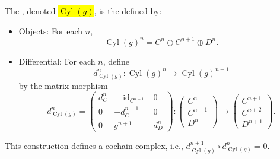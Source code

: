 \begin{definition}
\begin{enumerate}
        The , denoted \hl{$\operatorname{Cyl}(g)$}, is the  defined by:
        \begin{itemize}
        \item Objects: For each $n$, 
        $$\operatorname{Cyl}(g)^n = C^n \oplus C^{n+1} \oplus D^n.$$
        \item Differential: For each $n$, define
        $$d_{\operatorname{Cyl}(g)}^n : \operatorname{Cyl}(g)^n \to \operatorname{Cyl}(g)^{n+1}$$
        by the matrix morphism
        $$d_{\operatorname{Cyl}(g)}^n = \begin{pmatrix} d_C^n & -\operatorname{id}_{C^{n+1}} & 0 \\ 0 & -d_C^{n+1} & 0 \\ 0 & g^{n+1} & d_D^n \end{pmatrix} : \begin{pmatrix} C^n \\ C^{n+1} \\ D^n \end{pmatrix} \to \begin{pmatrix} C^{n+1} \\ C^{n+2} \\ D^{n+1} \end{pmatrix}.$$
        \end{itemize}

        This construction defines a cochain complex, i.e., $d_{\operatorname{Cyl}(g)}^{n+1} \circ d_{\operatorname{Cyl}(g)}^n = 0$.
    \end{enumerate}
\end{definition}